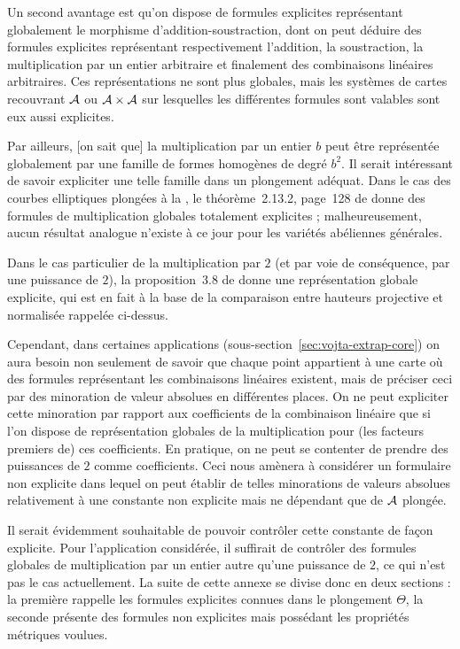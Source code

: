 Un second avantage est qu'on dispose de formules explicites représentant
globalement le morphisme d'addition-soustraction, dont on peut déduire des
formules explicites représentant respectivement l'addition, la soustraction, la
multiplication par un entier arbitraire et finalement des combinaisons
linéaires arbitraires. Ces représentations ne sont plus globales, mais les
systèmes de cartes recouvrant \( \mathcal A \) ou \( \mathcal A \times \mathcal A \) sur lesquelles
les différentes formules sont valables sont eux aussi explicites.

Par ailleurs, [on sait que] la multiplication par un
entier \( b \) peut être représentée globalement par une famille de formes
homogènes de degré \( b^2 \). Il serait intéressant de savoir expliciter une
telle famille dans un plongement adéquat. Dans le cas des courbes elliptiques
plongées à la , le théorème~2.13.2, page~128 de \cite{farhith}
donne des formules de multiplication globales totalement explicites ;
malheureusement, aucun résultat analogue n'existe à ce jour pour les variétés
abéliennes générales.

Dans le cas particulier de la multiplication par \( 2 \) (et par voie de
conséquence, par une puissance de \( 2 \)), la proposition~3.8 de
\cite{daphimhva2} donne une représentation globale explicite, qui est en fait
à la base de la comparaison entre hauteurs projective et normalisée rappelée
ci-dessus.

Cependant, dans certaines applications
(sous-section~\ref{sec:vojta-extrap-core}) on aura besoin non seulement de
savoir que chaque point appartient à une carte où des formules représentant
les combinaisons linéaires existent, mais de préciser ceci par des minoration
de valeur absolues en différentes places. On ne peut expliciter cette
minoration par rapport aux coefficients de la combinaison linéaire que si l'on
dispose de représentation globales de la multiplication pour (les facteurs
premiers de) ces coefficients. En pratique, on ne peut se contenter de prendre
des puissances de \( 2 \) comme coefficients. Ceci nous amènera à considérer
un formulaire non explicite dans lequel on peut établir de telles minorations
de valeurs absolues relativement à une constante non explicite mais ne
dépendant que de \( \mathcal A \) plongée.

Il serait évidemment souhaitable de pouvoir contrôler cette constante de façon
explicite. Pour l'application considérée, il suffirait de contrôler des
formules globales de multiplication par un entier autre qu'une puissance de \(
  2 \), ce qui n'est pas le cas actuellement. La suite de cette annexe se
divise donc en deux sections : la première rappelle les formules explicites
connues dans le plongement \( \Theta \), la seconde présente des formules non
explicites mais possédant les propriétés métriques voulues.


